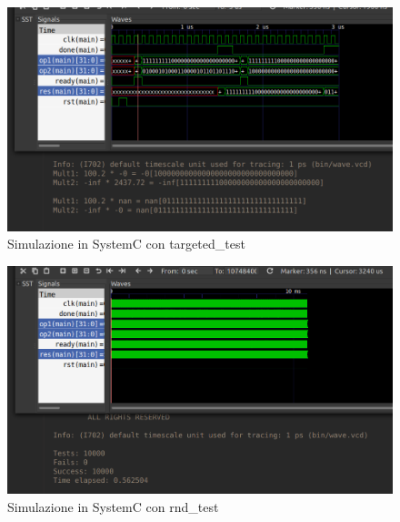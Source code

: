 \documentclass[]{IEEEtran}
\begin{document}
\begin{figure}[bt]
    \centering
    \includegraphics[width=\textwidth]{figures/simulazione2}
    \caption{Simulazione in SystemC con targeted\_test}
    \label{fig:SIM2}
\end{figure}

\begin{figure}[bt]
    \centering
    \includegraphics[width=\textwidth]{figures/simulazione3}
    \caption{Simulazione in SystemC con rnd\_test}
    \label{fig:SIM3}
\end{figure}
\end{document}
